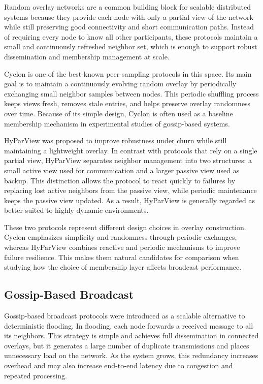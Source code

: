 \documentclass[sigconf,a4paper]{acmart}
\begin{document}
Random overlay networks are a common building block for scalable
distributed systems because they provide each node with only a partial
view of the network while still preserving good connectivity and
short communication paths. Instead of requiring every node to know all
other participants, these protocols maintain a small and continuously
refreshed neighbor set, which is enough to support robust dissemination
and membership management at scale.

Cyclon is one of the best-known peer-sampling protocols in this space.
Its main goal is to maintain a continuously evolving random overlay by
periodically exchanging small neighbor samples between nodes. This
periodic shuffling process keeps views fresh, removes stale entries,
and helps preserve overlay randomness over time. Because of its simple
design, Cyclon is often used as a baseline membership mechanism in
experimental studies of gossip-based systems.

HyParView was proposed to improve robustness under churn while still
maintaining a lightweight overlay. In contrast with protocols that rely
on a single partial view, HyParView separates neighbor management into
two structures: a small active view used for communication and a larger
passive view used as backup. This distinction allows the protocol to
react quickly to failures by replacing lost active neighbors from the
passive view, while periodic maintenance keeps the passive view updated.
As a result, HyParView is generally regarded as better suited to highly
dynamic environments.

These two protocols represent different design choices in overlay
construction. Cyclon emphasizes simplicity and randomness through
periodic exchanges, whereas HyParView combines reactive and periodic
mechanisms to improve failure resilience. This makes them natural
candidates for comparison when studying how the choice of membership
layer affects broadcast performance.

\subsection{Gossip-Based Broadcast}

Gossip-based broadcast protocols were introduced as a scalable
alternative to deterministic flooding. In flooding, each node forwards a
received message to all its neighbors. This strategy is simple and
achieves full dissemination in connected overlays, but it generates a
large number of duplicate transmissions and places unnecessary load on
the network. As the system grows, this redundancy increases overhead and
may also increase end-to-end latency due to congestion and repeated
processing.
\end{document}
